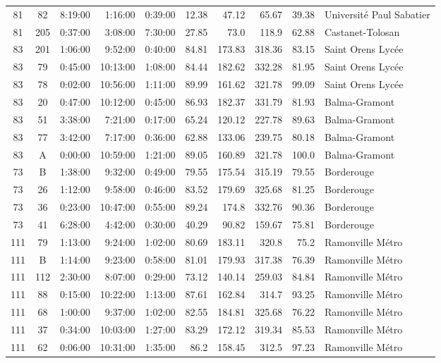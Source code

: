 \documentclass[twoside,12pt]{article}
\begin{document}
\begin{footnotesize}
\begin{longtable}{|c|c|r|r|r|r|r|r|r|l|}
	81	&	82	&	8:19:00	&	1:16:00	&	0:39:00	&	12.38	&	47.12	&	65.67	&	39.38	&	Université Paul Sabatier	\\
	81	&	205	&	0:37:00	&	3:08:00	&	7:30:00	&	27.85	&	73.0	&	118.9	&	62.88	&	Castanet-Tolosan	\\
	83	&	201	&	1:06:00	&	9:52:00	&	0:40:00	&	84.81	&	173.83	&	318.36	&	83.15	&	Saint Orens Lycée	\\
	83	&	79	&	0:45:00	&	10:13:00	&	1:08:00	&	84.44	&	182.62	&	332.28	&	81.95	&	Saint Orens Lycée	\\
	83	&	78	&	0:02:00	&	10:56:00	&	1:11:00	&	89.99	&	161.62	&	321.78	&	99.09	&	Saint Orens Lycée	\\
	83	&	20	&	0:47:00	&	10:12:00	&	0:45:00	&	86.93	&	182.37	&	331.79	&	81.93	&	Balma-Gramont	\\
	83	&	51	&	3:38:00	&	7:21:00	&	0:17:00	&	65.24	&	120.12	&	227.78	&	89.63	&	Balma-Gramont	\\
	83	&	77	&	3:42:00	&	7:17:00	&	0:36:00	&	62.88	&	133.06	&	239.75	&	80.18	&	Balma-Gramont	\\
	83	&	A	&	0:00:00	&	10:59:00	&	1:21:00	&	89.05	&	160.89	&	321.78	&	100.0	&	Balma-Gramont	\\
	73	&	B	&	1:38:00	&	9:32:00	&	0:49:00	&	79.55	&	175.54	&	315.19	&	79.55	&	Borderouge	\\
	73	&	26	&	1:12:00	&	9:58:00	&	0:46:00	&	83.52	&	179.69	&	325.68	&	81.25	&	Borderouge	\\
	73	&	36	&	0:23:00	&	10:47:00	&	0:55:00	&	89.24	&	174.8	&	332.76	&	90.36	&	Borderouge	\\
	73	&	41	&	6:28:00	&	4:42:00	&	0:30:00	&	40.29	&	90.82	&	159.67	&	75.81	&	Borderouge	\\
	111	&	79	&	1:13:00	&	9:24:00	&	1:02:00	&	80.69	&	183.11	&	320.8	&	75.2	&	Ramonville Métro	\\
	111	&	B	&	1:14:00	&	9:23:00	&	0:58:00	&	81.01	&	179.93	&	317.38	&	76.39	&	Ramonville Métro	\\
	111	&	112	&	2:30:00	&	8:07:00	&	0:29:00	&	73.12	&	140.14	&	259.03	&	84.84	&	Ramonville Métro	\\
	111	&	88	&	0:15:00	&	10:22:00	&	1:13:00	&	87.61	&	162.84	&	314.7	&	93.25	&	Ramonville Métro	\\
	111	&	68	&	1:00:00	&	9:37:00	&	1:02:00	&	82.55	&	184.81	&	325.68	&	76.22	&	Ramonville Métro	\\
	111	&	37	&	0:34:00	&	10:03:00	&	1:27:00	&	83.29	&	172.12	&	319.34	&	85.53	&	Ramonville Métro	\\
	111	&	62	&	0:06:00	&	10:31:00	&	1:35:00	&	86.2	&	158.45	&	312.5	&	97.23	&	Ramonville Métro	\\

\end{longtable}
\end{footnotesize}
\end{document}
